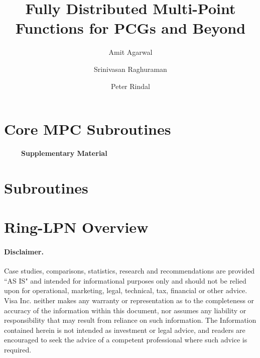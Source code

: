 \documentclass[11pt]{article}
\begin{document}
\title{Fully Distributed Multi-Point Functions for PCGs and Beyond}
\author{Amit Agarwal \and Srinivasan Raghuraman \and Peter Rindal}

\maketitle 










\iffull
\section{Core MPC Subroutines}
\label{sec:subroutines}

\fi



\iffull


\else

\fi







\appendix





\iffull
\else

{\LARGE \bf \verb+    + Supplementary Material}
\section{Subroutines}
\label{sec:subroutines}






\section{Ring-LPN Overview}\label{sec:ringLpnOverview}


\fi

\iffull
\paragraph{Disclaimer.} Case studies, comparisons, statistics, research and recommendations are provided ``AS IS" and intended for informational purposes only and should not be relied upon for operational, marketing, legal, technical, tax, financial or other advice. Visa Inc. neither makes any warranty or representation as to the completeness or accuracy of the information within this document, nor assumes any liability or responsibility that may result from reliance on such information. The Information contained herein is not intended as investment or legal advice, and readers are encouraged to seek the advice of a competent professional where such advice is required.
\end{document}
